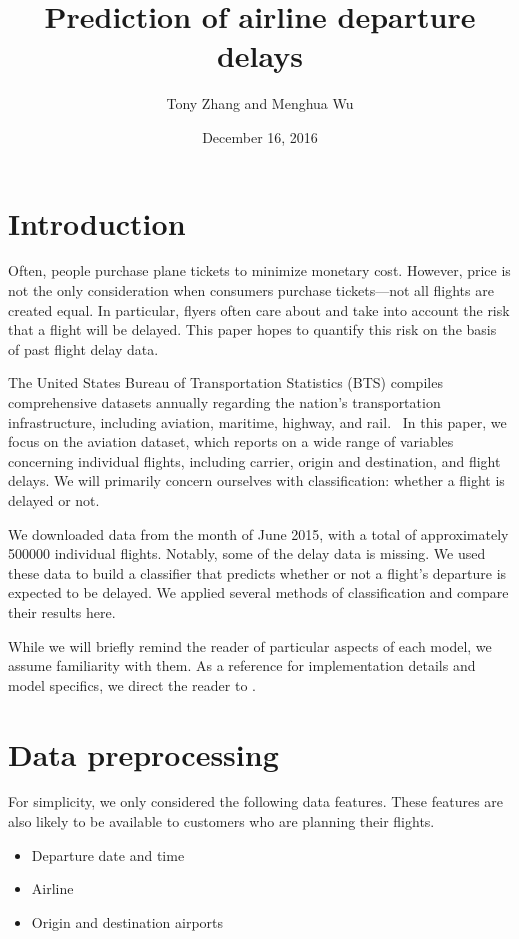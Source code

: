\documentclass{article}
\title{Prediction of airline departure delays}
\author{Tony Zhang and Menghua Wu}
\date{December 16, 2016}
\begin{document}
\maketitle

\begin{multicols}{2}


\section{Introduction}

Often, people purchase plane tickets
to minimize monetary cost.
However, price is not the only consideration
when consumers purchase tickets---not
all flights are created equal.
In particular,
flyers often care about and take into account
the risk that a flight will be delayed.
This paper hopes to quantify this risk
on the basis of past flight delay data.

The United States Bureau of Transportation Statistics (BTS)
compiles comprehensive datasets annually
regarding the nation's transportation infrastructure,
including aviation, maritime, highway, and rail.~\cite{bts}
In this paper, we focus on the aviation dataset,
which reports on a wide range of variables concerning individual flights,
including carrier, origin and destination, and flight delays.
We will primarily concern ourselves with classification:
whether a flight is delayed or not.

We downloaded data from the month of June 2015,
with a total of approximately 500000 individual flights.
Notably, some of the delay data is missing.
We used these data to build a classifier
that predicts whether or not a flight's departure
is expected to be delayed.
We applied several methods of classification
and compare their results here.

While we will briefly remind the reader
of particular aspects of each model,
we assume familiarity with them.
As a reference for implementation details and model specifics,
we direct the reader to \cite{sklearn-ug}.

\section{Data preprocessing}

For simplicity,
we only considered the following data features.
These features are also likely to be available to
customers who are planning their flights.
\begin{itemize}
    \item
    Departure date and time
    \item
    Airline
    \item
    Origin and destination airports
\end{itemize}


\end{multicols}
\end{document}
